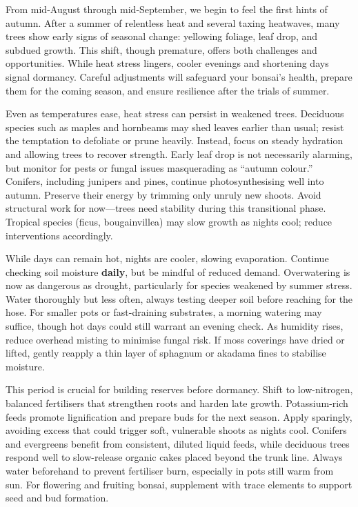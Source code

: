 \label{2025-08-care}
\noindent  
From mid\--August through mid\--September, we begin to feel the first hints of autumn. 
After a summer of relentless heat and several taxing heatwaves, many trees show early signs of seasonal change: yellowing foliage, leaf drop, and subdued growth. 
This shift, though premature, offers both challenges and opportunities. 
While heat stress lingers, cooler evenings and shortening days signal dormancy. 
Careful adjustments will safeguard your bonsai's health, prepare them for the coming season, and ensure resilience after the trials of summer.  

\medskip  
{}  
\noindent  
Even as temperatures ease, heat stress can persist in weakened trees. 
Deciduous species such as maples and hornbeams may shed leaves earlier than usual; resist the temptation to defoliate or prune heavily. 
Instead, focus on steady hydration and allowing trees to recover strength. 
Early leaf drop is not necessarily alarming, but monitor for pests or fungal issues masquerading as ``autumn colour.''
Conifers, including junipers and pines, continue photosynthesising well into autumn. 
Preserve their energy by trimming only unruly new shoots. 
Avoid structural work for now---trees need stability during this transitional phase. 
Tropical species (ficus, bougainvillea) may slow growth as nights cool; reduce interventions accordingly.  

\medskip  
{}  
\noindent  
While days can remain hot, nights are cooler, slowing evaporation. 
Continue checking soil moisture \textbf{daily}, but be mindful of reduced demand. 
Overwatering is now as dangerous as drought, particularly for species weakened by summer stress. 
Water thoroughly but less often, always testing deeper soil before reaching for the hose.
For smaller pots or fast\--draining substrates, a morning watering may suffice, though hot days could still warrant an evening check. 
As humidity rises, reduce overhead misting to minimise fungal risk. 
If moss coverings have dried or lifted, gently reapply a thin layer of sphagnum or akadama fines to stabilise moisture.  

\medskip  
{}  
\noindent  
This period is crucial for building reserves before dormancy. 
Shift to low\--nitrogen, balanced fertilisers that strengthen roots and harden late growth. 
Potassium\--rich feeds promote lignification and prepare buds for the next season. 
Apply sparingly, avoiding excess that could trigger soft, vulnerable shoots as nights cool.
Conifers and evergreens benefit from consistent, diluted liquid feeds, while deciduous trees respond well to slow\--release organic cakes placed beyond the trunk line. 
Always water beforehand to prevent fertiliser burn, especially in pots still warm from sun. 
For flowering and fruiting bonsai, supplement with trace elements to support seed and bud formation.  

